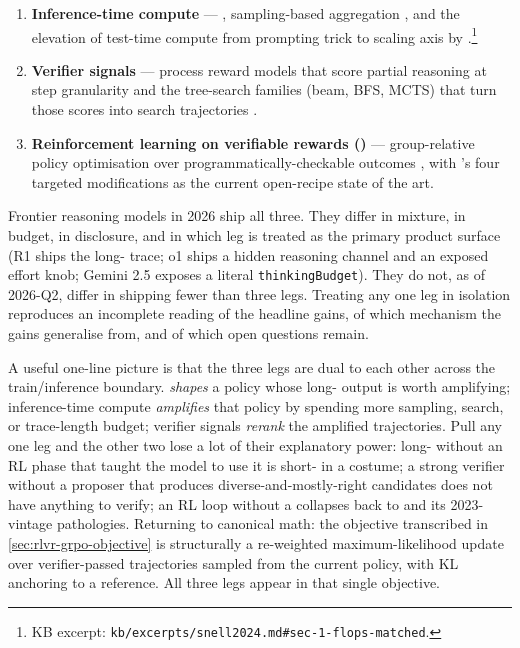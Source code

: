 \begin{enumerate}
\item \textbf{Inference-time compute} — 
  \citep{wei2022-cot,kojima2022}, sampling-based aggregation
  \citep{wang2022-self-consistency}, and the elevation of test-time
  compute from prompting trick to scaling axis by
  \citet{snell2024}.\footnote{KB excerpt:
  \nolinkurl{kb/excerpts/snell2024.md#sec-1-flops-matched}.}

\item \textbf{Verifier signals} — process reward models that score
  partial reasoning at step granularity \citep{lightman2023-prm800k}
  and the tree-search families (beam, BFS, MCTS) that turn those
  scores into search trajectories \citep{rstar-math2025}.

\item \textbf{Reinforcement learning on verifiable rewards ()} ---
  group-relative policy optimisation over programmatically-checkable
  outcomes \citep{shao2024}, with 's four targeted modifications
  \citep{dapo2025} as the current open-recipe state of the art.
\end{enumerate}

Frontier reasoning models in 2026 ship all three. They differ in
mixture, in budget, in disclosure, and in which leg is treated as the
primary product surface (R1 ships the long- trace; o1 ships a
hidden reasoning channel and an exposed effort knob; Gemini 2.5
exposes a literal \texttt{thinkingBudget}). They do not, as of
2026-Q2, differ in shipping fewer than three legs. Treating any one
leg in isolation reproduces an incomplete reading of the headline
gains, of which mechanism the gains generalise from, and of which open
questions remain.

\begin{intuition}
A useful one-line picture is that the three legs are dual to each
other across the train/inference boundary.  \emph{shapes} a policy
whose long- output is worth amplifying; inference-time compute
\emph{amplifies} that policy by spending more sampling, search, or
trace-length budget; verifier signals \emph{rerank} the amplified
trajectories. Pull any one leg and the other two lose a lot of their
explanatory power: long- without an RL phase that taught the model
to use it is short- in a costume; a strong verifier without a
proposer that produces diverse-and-mostly-right candidates does not
have anything to verify; an RL loop without a 
collapses back to  and its 2023-vintage pathologies. Returning to
canonical math: the  objective transcribed in
\cref{sec:rlvr-grpo-objective} is structurally a re-weighted
maximum-likelihood update over verifier-passed trajectories sampled
from the current policy, with KL anchoring to a reference. All three
legs appear in that single objective.
\end{intuition}

